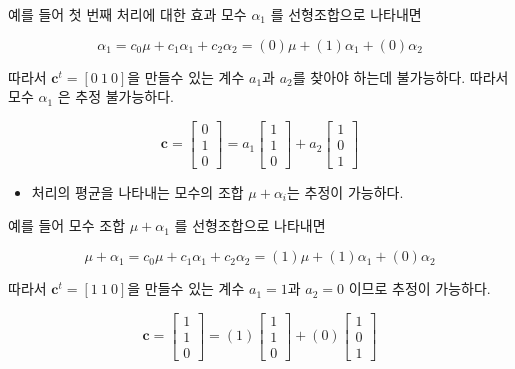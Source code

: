 \documentclass[
]{book}
\providecommand{\tightlist}{%
  \setlength{\itemsep}{0pt}\setlength{\parskip}{0pt}}
\newcommand{\bm}[1]{\boldsymbol{\mathbf{#1}}}
\begin{document}
예를 들어 첫 번째 처리에 대한 효과 모수 \(\alpha_1\) 를 선형조합으로 나타내면

\[ \alpha_1 = c_0 \mu + c_1 \alpha_1 + c_2 \alpha_2 = (0) \mu + (1) \alpha_1 + (0) \alpha_2 \]

따라서 \(\bm c^t = [0~1~0]\)을 만들수 있는 계수 \(a_1\)과 \(a_2\)를 찾아야 하는데 불가능하다. 따라서 모수 \(\alpha_1\) 은 추정 불가능하다.

\begin{equation*}
\bm c =
\begin{bmatrix}
0 \\
1 \\
0 
\end{bmatrix}
= 
a_1
\begin{bmatrix}
1 \\
1 \\
0 
\end{bmatrix}
+ 
a_2
\begin{bmatrix}
1 \\
0 \\
1 
\end{bmatrix}
\end{equation*}

\begin{itemize}
\tightlist
\item
  처리의 평균을 나타내는 모수의 조합 \(\mu + \alpha_i\)는 추정이 가능하다.
\end{itemize}

예를 들어 모수 조합 \(\mu + \alpha_1\) 를 선형조합으로 나타내면

\[ \mu + \alpha_1 = c_0 \mu + c_1 \alpha_1 + c_2 \alpha_2 = (1) \mu + (1) \alpha_1 + (0) \alpha_2 \]

따라서 \(\bm c^t = [1~1~0]\)을 만들수 있는 계수 \(a_1=1\)과 \(a_2=0\) 이므로 추정이 가능하다.

\begin{equation*}
\bm c =
\begin{bmatrix}
1 \\
1 \\
0 
\end{bmatrix}
= 
(1)
\begin{bmatrix}
1 \\
1 \\
0 
\end{bmatrix}
+ 
(0)
\begin{bmatrix}
1 \\
0 \\
1 
\end{bmatrix}
\end{equation*}
\end{document}
